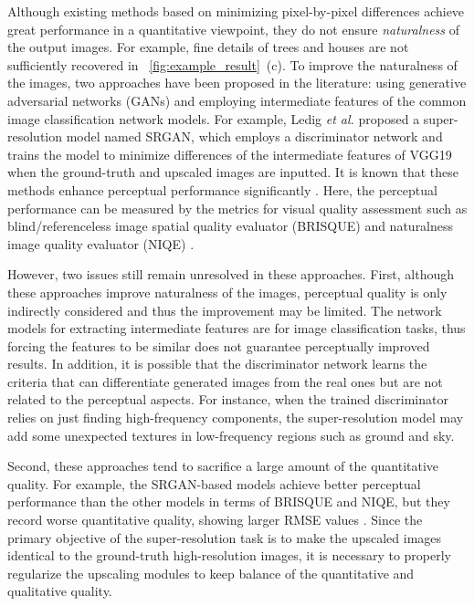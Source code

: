 \documentclass[runningheads]{llncs}
\begin{document}
Although existing methods based on minimizing pixel-by-pixel differences achieve great performance in a quantitative viewpoint, they do not ensure \textit{naturalness} of the output images.
For example, fine details of trees and houses are not sufficiently recovered in \figurename~\ref{fig:example_result}~(c).
To improve the naturalness of the images, two approaches have been proposed in the literature: using generative adversarial networks (GANs) \cite{goodfellow2014generative} and employing intermediate features of the common image classification network models.
For example, Ledig \textit{et al.} \cite{ledig2017photo} proposed a super-resolution model named SRGAN, which employs a discriminator network and trains the model to minimize differences of the intermediate features of VGG19 \cite{simonyan2014very} when the ground-truth and upscaled images are inputted.
It is known that these methods enhance perceptual performance significantly \cite{blau2017perception}.
Here, the perceptual performance can be measured by the metrics for visual quality assessment such as blind/referenceless image spatial quality evaluator (BRISQUE) \cite{mittal2012no} and naturalness image quality evaluator (NIQE) \cite{mittal2013making}.

However, two issues still remain unresolved in these approaches.
First, although these approaches improve naturalness of the images, perceptual quality is only indirectly considered and thus the improvement may be limited.
The network models for extracting intermediate features are for image classification tasks, thus forcing the features to be similar does not guarantee perceptually improved results.
In addition, it is possible that the discriminator network learns the criteria that can differentiate generated images from the real ones but are not related to the perceptual aspects.
For instance, when the trained discriminator relies on just finding high-frequency components, the super-resolution model may add some unexpected textures in low-frequency regions such as ground and sky.

Second, these approaches tend to sacrifice a large amount of the quantitative quality.
For example, the SRGAN-based models achieve better perceptual performance than the other models in terms of BRISQUE and NIQE, but they record worse quantitative quality, showing larger RMSE values \cite{blau2017perception}.
Since the primary objective of the super-resolution task is to make the upscaled images identical to the ground-truth high-resolution images, it is necessary to properly regularize the upscaling modules to keep balance of the quantitative and qualitative quality.
\end{document}
